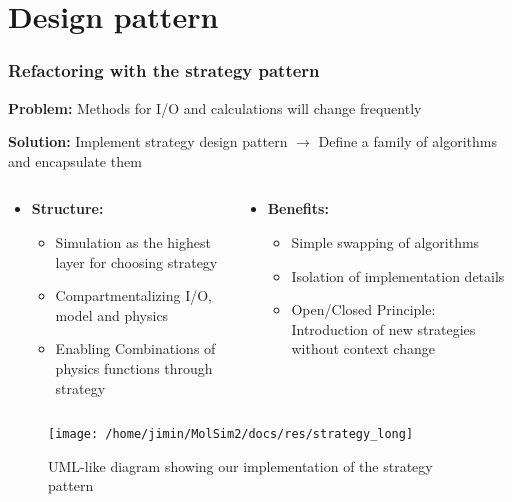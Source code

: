\section{Design pattern}

\begin{frame}
    \frametitle{Refactoring with the strategy pattern}
    \vspace{-5pt}
    \textbf{Problem:} Methods for I/O and calculations will change frequently

    \vspace{-5pt}
    \textbf{Solution:} Implement strategy design pattern $\rightarrow$ Define a family of algorithms and encapsulate them

    \vspace{-5pt}
    \begin{columns}
        \begin{column}{0.5\textwidth}
            \begin{itemize}
                \item \textbf{Structure: } 
                \vspace{-5pt}
                \begin{itemize}
                    \item Simulation as the highest layer for choosing strategy
                    \item Compartmentalizing I/O, model and physics
                    \item Enabling Combinations of physics functions through strategy
                \end{itemize}
            \end{itemize}
        \end{column}
        \begin{column}{0.5\textwidth}
            \begin{itemize}
                \item \textbf{Benefits: }
                    \begin{itemize}
                        \item Simple swapping of algorithms
                        \item Isolation of implementation details
                        \item Open/Closed Principle: Introduction of new strategies without context change
                    \end{itemize}
            \end{itemize}
        \end{column}
    \end{columns}

    \begin{figure}
        \texttt{[image: /home/jimin/MolSim2/docs/res/strategy\_long]}
        \caption{UML-like diagram showing our implementation of the strategy pattern}
    \end{figure}

\end{frame}